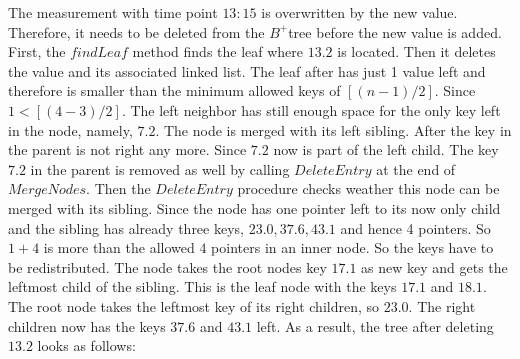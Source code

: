 \documentclass[abstracton,12pt]{scrreprt}
\begin{document}
\begin{exmp}
	The measurement with time point $13:15$ is overwritten by the new value. Therefore, it needs to be deleted from the $B^+$tree before the new value is added. First, the $findLeaf$ method finds the leaf where $13.2$ is located. Then it deletes the value and its associated linked list. The leaf after has just 1 value left and therefore is smaller than the minimum allowed keys of $[(n-1)/2]$. Since $1<[(4-3)/2]$. The left neighbor has still enough space for the only key left in the node, namely, $7.2$. The node is merged with its left sibling. After the key in the parent is not right any more. Since $7.2$ now is part of the left child. The key $7.2$ in the parent is removed as well by calling $DeleteEntry$ at the end of $MergeNodes$. Then the $DeleteEntry$ procedure checks weather this node can be merged with its sibling. Since the node has one pointer left to its now only child and the sibling has already three keys, $23.0,37.6, 43.1$ and hence 4 pointers. So $1+4$ is more than the allowed $4$ pointers in an inner node. So the keys have to be redistributed. The node takes the root nodes key $17.1$ as new key and gets the leftmost child of the sibling. This is the leaf node with the keys $17.1$ and $18.1$. The root node takes the leftmost key of its right children, so $23.0$. The right children now has the keys $37.6$ and $43.1$ left. 
	As a result, the tree after deleting $13.2$ looks as follows: 
\end{exmp}
\end{document}
